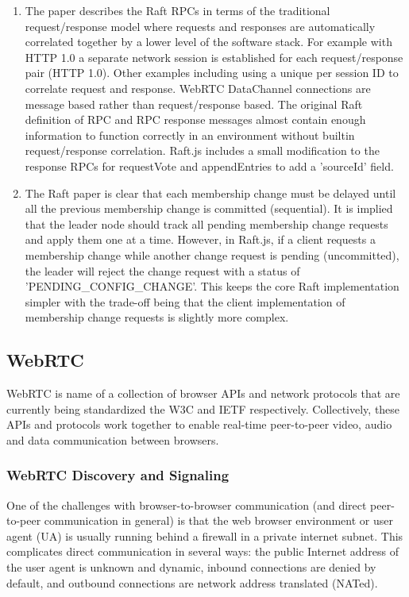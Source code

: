 \documentclass[9pt]{extarticle}
\begin{document}
\begin{multicols}{2}
\begin{enumerate}
\item The paper describes the Raft RPCs in terms of the traditional request/response model where requests and responses are automatically correlated together by a lower level of the software stack. For example with HTTP 1.0 a separate network session is established for each request/response pair (HTTP 1.0). Other examples including using a unique per session ID to correlate request and response.  WebRTC DataChannel connections are message based rather than request/response based. The original Raft definition of RPC and RPC response messages almost contain enough information to function correctly in an environment without builtin request/response correlation. Raft.js includes a small modification to the response RPCs for requestVote and appendEntries to add a 'sourceId' field.
\item The Raft paper is clear that each membership change must be delayed until all the previous membership change is committed (sequential).  It is implied that the leader node should track all pending membership change requests and apply them one at a time. However, in Raft.js, if a client requests a membership change while another change request is pending (uncommitted), the leader will reject the change request with a status of 'PENDING\_CONFIG\_CHANGE'. This keeps the core Raft implementation simpler with the trade-off being that the client implementation of membership change requests is slightly more complex.
\end{enumerate}

\subsection{WebRTC}

WebRTC is name of a collection of browser APIs and network protocols
that are currently being standardized the W3C and IETF respectively.
Collectively, these APIs and protocols work together to enable
real-time peer-to-peer video, audio and data communication between
browsers.

\subsubsection{WebRTC Discovery and Signaling}

One of the challenges with browser-to-browser communication (and
direct peer-to-peer communication in general) is that the web browser
environment or user agent (UA) is usually running behind a firewall in
a private internet subnet. This complicates direct communication in
several ways: the public Internet address of the user agent is unknown
and dynamic, inbound connections are denied by default, and outbound
connections are network address translated (NATed).


\end{multicols}
\end{document}
